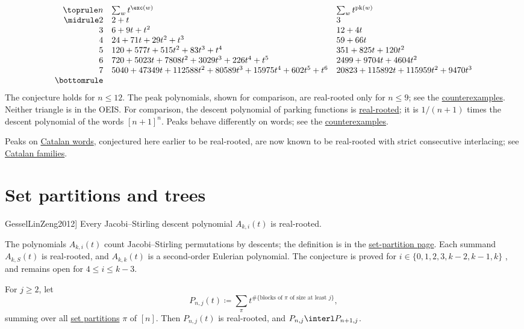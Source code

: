 \[
\begin{array}{rll}
\toprule
n & \sum_{w}t^{\exc(w)} & \sum_{w}t^{\operatorname{pk}(w)} \\
\midrule
2 & 2+t & 3 \\
3 & 6+9t+t^2 & 12+4t \\
4 & 24+71t+29t^2+t^3 & 59+66t \\
5 & 120+577t+515t^2+83t^3+t^4 & 351+825t+120t^2 \\
6 & 720+5023t+7808t^2+3029t^3+226t^4+t^5 & 2499+9704t+4604t^2 \\
7 & 5040+47349t+112588t^2+80589t^3+15975t^4+602t^5+t^6
  & 20823+115892t+115959t^2+9470t^3 \\
\bottomrule
\end{array}
\]
The conjecture holds for $n\leq12$.  The peak polynomials, shown for comparison, are real-rooted only for
$n\leq9$; see the \hyperref[counterexamplesParkingPeaks]{counterexamples}.
Neither triangle is in the OEIS.  For comparison, the
descent polynomial of parking functions is
\hyperref[parkingFunctionDescentsRealRooted]{real-rooted}; it is $1/(n+1)$
times the descent polynomial of the words $[n+1]^n$.  Peaks behave
differently on words; see the
\hyperref[realRootedCounterexamples]{counterexamples}.

Peaks on \hyperref[catalanWordDefinition]{Catalan words}, conjectured here
earlier to be real-rooted, are now known to be real-rooted with strict
consecutive interlacing; see \hyperref[catalanWordPeaksRealRooted]{Catalan
families}.


\section[openProblemsSetPartitions]{Set partitions and trees}

\begin{conjecture}[Gessel--Lin--Zeng, \cite[Conj.~15]{GesselLinZeng2012}]
\label{conjJacobiStirling}
Every Jacobi--Stirling descent polynomial $A_{k,i}(t)$ is real-rooted.
\end{conjecture}

The polynomials $A_{k,i}(t)$ count Jacobi--Stirling permutations by
descents; the definition is in the
\hyperref[jacobiStirlingDescentRealRooted]{set-partition page}.  Each
summand $A_{k,S}(t)$ is real-rooted, and $A_{k,k}(t)$ is a second-order
Eulerian polynomial.  The conjecture is proved for
$i\in\{0,1,2,3,k-2,k-1,k\}$ \cite[Thm.~2]{MaWang2026x}, and remains open
for $4\leq i\leq k-3$.

\begin{conjecture}[Alexandersson, 2026]
\label{conjBigBlocks}
For $j\geq2$, let
\[
  P_{n,j}(t)\coloneqq\sum_{\pi}t^{\#\{\text{blocks of $\pi$ of size at least $j$}\}},
\]
summing over all \hyperref[setPartitions]{set partitions} $\pi$ of $[n]$.
Then $P_{n,j}(t)$ is real-rooted, and $P_{n,j}\interl P_{n+1,j}$.
\end{conjecture}

